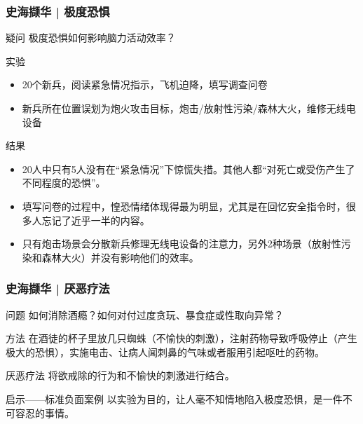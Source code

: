 \begin{frame}
  \frametitle{史海撷华 | 极度恐惧}
  \begin{block}{疑问}
    极度恐惧如何影响脑力活动效率？
  \end{block}
  \vspace{-0.3em}
  \pause
  \begin{block}{实验}
    \begin{itemize}
      \item 20个新兵，阅读紧急情况指示，飞机迫降，填写调查问卷
      \item 新兵所在位置误划为炮火攻击目标，炮击/放射性污染/森林大火，维修无线电设备
    \end{itemize}
  \end{block}
  \vspace{-0.3em}
  \pause
  \begin{block}{结果}
    \begin{itemize}
      \item 20人中只有5人没有在“紧急情况”下惊慌失措。其他人都“对死亡或受伤产生了不同程度的恐惧”。
      \item 填写问卷的过程中，惶恐情绪体现得最为明显，尤其是在回忆安全指令时，很多人忘记了近乎一半的内容。
      \item 只有炮击场景会分散新兵修理无线电设备的注意力，另外2种场景（放射性污染和森林大火）并没有影响他们的效率。
    \end{itemize}
  \end{block}
\end{frame}

\begin{frame}
  \frametitle{史海撷华 | 厌恶疗法}
  \begin{block}{问题}
    如何消除酒瘾？如何对付过度贪玩、暴食症或性取向异常？
  \end{block}
  \pause
  \begin{block}{方法}
在酒徒的杯子里放几只蜘蛛（不愉快的刺激），注射药物导致呼吸停止（产生极大的恐惧），实施电击、让病人闻刺鼻的气味或者服用引起呕吐的药物。
  \end{block}
  \pause
  \begin{block}{厌恶疗法}
    将欲戒除的行为和不愉快的刺激进行结合。
  \end{block}
  \pause
  \begin{block}{启示——标准负面案例}
    以实验为目的，让人毫不知情地陷入极度恐惧，是一件不可容忍的事情。
  \end{block}
\end{frame}

